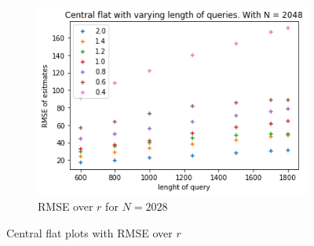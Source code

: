 \documentclass[11pt]{article}
\theoremstyle{definition}
\begin{document}
\begin{figure}[H]
\begin{subfigure}{.4\textwidth}
  \includegraphics[width=\linewidth]{figures/central_flat/varying_r/cen_flat_varying_length_N=2048.png}
  \caption{RMSE over $r$ for $N=2028$}
  \label{fig:cen_r_sub3}
\end{subfigure}
\caption{Central flat plots with RMSE over $r$}
\label{fig:plt_cen_r}
\end{figure}
\end{document}
